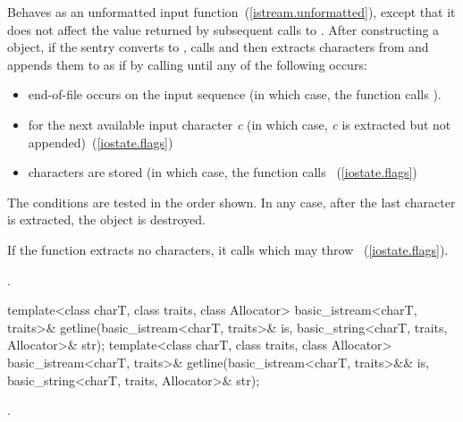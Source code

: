 \begin{itemdescr}
\pnum
\effects
Behaves as an unformatted input function~(\ref{istream.unformatted}),
except that it does not affect the value returned by subsequent calls to
.
After constructing a
object, if the sentry converts to , calls
and then extracts characters from  and appends them
to  as if by calling
until any of the following occurs:

\begin{itemize}
\item
end-of-file occurs on the input sequence
(in which case, the
function calls
).
\item
{}
for the next available input character
\textit{c}
(in which case,
\textit{c}
is extracted but not appended)~(\ref{iostate.flags})
\item
{}
characters are stored
(in which case,
the function calls
~(\ref{iostate.flags})
\end{itemize}

\pnum
The conditions are tested in the order shown.
In any case,
after the last character is extracted, the
object 
is destroyed.

\pnum
If the function extracts no characters, it calls
which may throw
~(\ref{iostate.flags}).

\pnum
\returns
{}.
\end{itemdescr}

%
\begin{itemdecl}
template<class charT, class traits, class Allocator>
  basic_istream<charT, traits>&
    getline(basic_istream<charT, traits>& is,
            basic_string<charT, traits, Allocator>& str);
template<class charT, class traits, class Allocator>
  basic_istream<charT, traits>&
    getline(basic_istream<charT, traits>&& is,
            basic_string<charT, traits, Allocator>& str);
\end{itemdecl}

\begin{itemdescr}
\pnum
\returns
{}.
\end{itemdescr}

